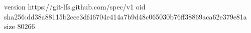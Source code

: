 version https://git-lfs.github.com/spec/v1
oid sha256:dd38a88115b2cce3df46704e414a7b9d48c065030b76ff38869aca62e379e81a
size 80266
